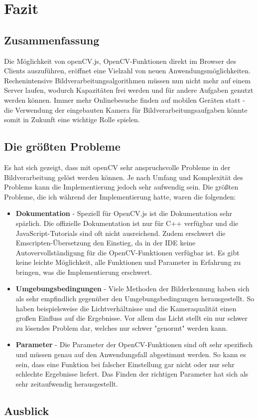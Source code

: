 \section{Fazit}

\subsection{Zusammenfassung}
Die Möglichkeit von openCV.js, OpenCV-Funktionen direkt im Browser des Clients auszuführen, eröffnet eine Vielzahl von neuen Anwendungsmöglichkeiten. Rechenintensive Bildverarbeitungsalgorithmen müssen nun nicht mehr auf einem Server laufen, wodurch Kapazitäten frei werden und für andere Aufgaben genutzt werden können. Immer mehr Onlinebesuche finden auf mobilen Geräten statt - die Verwendung der eingebauten Kamera für Bildverarbeitungsaufgaben könnte somit in Zukunft eine wichtige Rolle spielen. 

\subsection{Die größten Probleme}
Es hat sich gezeigt, dass mit openCV sehr anspruchsvolle Probleme in der Bildverarbeitung gelöst werden können. Je nach Umfang und Komplexität des Problems kann die Implementierung jedoch sehr aufwendig sein. Die größten Probleme, die ich während der Implementierung hatte, waren die folgenden:

\begin{itemize}
    \item \textbf{Dokumentation} - Speziell für OpenCV.js ist die Dokumentation sehr spärlich. Die offizielle Dokumentation ist nur für C++ verfügbar und die JavaScript-Tutorials sind oft nicht ausreichend. Zudem erschwert die Emscripten-Übersetzung den Einstieg, da in der IDE keine Autovervollständigung für die OpenCV-Funktionen verfügbar ist. Es gibt keine leichte Möglichkeit, alle Funktionen und Parameter in Erfahrung zu bringen, was die Implementierung erschwert.
    \item \textbf{Umgebungsbedingungen} - Viele Methoden der Bilderkennung haben sich als sehr empfindlich gegenüber den Umgebungsbedingungen herausgestellt. So haben beispielsweise die Lichtverhältnisse und die Kameraqualität einen großen Einfluss auf die Ergebnisse. Vor allem das Licht stellt ein nur schwer zu lösendes Problem dar, welches nur schwer "genormt" werden kann. 
    \item \textbf{Parameter} - Die Parameter der OpenCV-Funktionen sind oft sehr spezifisch und müssen genau auf den Anwendungsfall abgestimmt werden. So kann es sein, dass eine Funktion bei falscher Einstellung gar nicht oder nur sehr schlechte Ergebnisse liefert. Das Finden der richtigen Parameter hat sich als sehr zeitaufwendig herausgestellt.
\end{itemize}

\subsection{Ausblick}